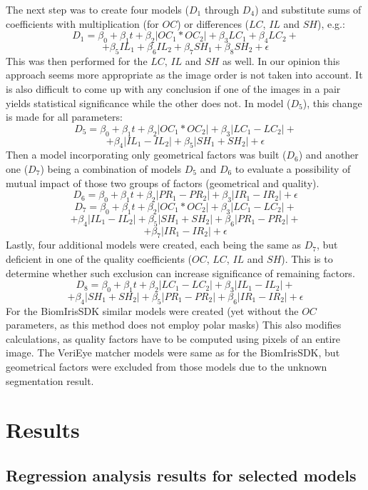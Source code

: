 \documentclass{article}
\begin{document}
The next step was to create four models ($D_1$ through $D_4$) and substitute sums of coefficients with multiplication (for $OC$) or differences ($LC$, $IL$ and $SH$), e.g.:
$$D_1 = \beta_0 + \beta_{1}t + \beta_{2}|OC_{1} * OC_{2}| + \beta_{3}LC_{1} + \beta_{4}LC_{2} +$$
$$+ \beta_{5}IL_{1} + \beta_{6}IL_{2} + \beta_{7}SH_{1} + \beta_{8}SH_{2} + \epsilon$$ 
This was then performed for the $LC$, $IL$ and $SH$ as well. In our opinion this approach seems more appropriate as the image order is not taken into account. It is also difficult to come up with any conclusion if one of the images in a pair yields statistical significance while the other does not. In model ($D_5$), this change is made for all parameters:
$$D_5 = \beta_0 + \beta_{1}t + \beta_{2}|OC_{1} * OC_{2}| + \beta_{3}|LC_{1} - LC_{2}| + $$
$$+ \beta_{4}|IL_{1} - IL_{2}| + \beta_{5}|SH_{1} + SH_{2}| + \epsilon$$  
Then a model incorporating only geometrical factors was built ($D_6$) and another one ($D_7$) being a combination of models $D_5$ and $D_6$ to evaluate a possibility of mutual impact of those two groups of factors (geometrical and quality).
$$D_6 = \beta_0 + \beta_{1}t + \beta_{2}|PR_{1} - PR_{2}| + \beta_{3}|IR_{1} - IR_{2}| + \epsilon$$
$$D_7 = \beta_0 + \beta_{1}t + \beta_{2}|OC_{1} * OC_{2}| + \beta_{3}|LC_{1} - LC_{2}| +$$
$$ + \beta_{4}|IL_{1} - IL_{2}| + \beta_{5}|SH_{1} + SH_{2}| + \beta_{6}|PR_{1} - PR_{2}| +$$
$$+ \beta_{7}|IR_{1} - IR_{2}| + \epsilon$$
Lastly, four additional models were created, each being the same as $D_7$, but deficient in one of the quality coefficients ($OC$, $LC$, $IL$ and $SH$). This is to determine whether such exclusion can increase significance of remaining factors.
$$D_8 = \beta_0 + \beta_{1}t + \beta_{2}|LC_{1} - LC_{2}| + \beta_{3}|IL_{1} - IL_{2}| + $$
$$+ \beta_{4}|SH_{1} + SH_{2}| + \beta_{5}|PR_{1} - PR_{2}| + \beta_{6}|IR_{1} - IR_{2}| + \epsilon$$
For the BiomIrisSDK similar models were created (yet without the $OC$ parameters, as this method does not employ polar masks) This also modifies calculations, as quality factors have to be computed using pixels of an entire image. The VeriEye matcher models were same as for the BiomIrisSDK, but geometrical factors were excluded from those models due to the unknown segmentation result. 


\section{Results}
\label{sec:results}
\subsection{Regression analysis results for selected models}
\end{document}
